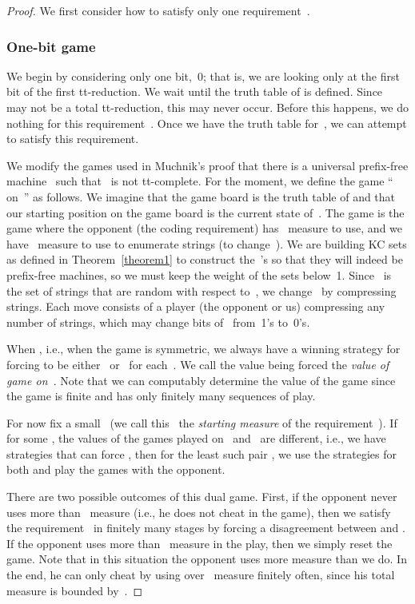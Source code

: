 \documentclass{LMCS}
\newcommand{\0}{\mathbf{0}}
\newcommand{\<}{\langle}
\renewcommand{\>}{\rangle}
\begin{document}
\begin{proof}
We first consider how to satisfy only one requirement~.



\subsubsection{One-bit game}\label{onebit}
We begin by considering only one bit,~0; that is, we are looking only at the
first bit of the first tt-reduction.  We wait until the truth table of
 is defined.  Since~ may not be a total tt-reduction, this
may never occur.   Before this happens, we do nothing for this
requirement~. Once we have the truth table for~, we
can attempt to satisfy this requirement.

We modify the games used in Muchnik's proof that there is a universal
prefix-free machine~ such that~ is not tt-complete.  For the
moment, we define the game `` on~'' as follows. We
imagine that the game board is the truth table of  and that our
starting position on the game board is the current state of~.  The game
 is the game where the opponent (the coding requirement)
has~ measure to use, and we have~ measure to use to
enumerate strings (to change~).  We are building KC sets as defined in
Theorem~\ref{theorem1} to construct the~'s so that they will indeed be
prefix-free machines, so we must keep the weight of the sets below~1.
Since~ is the set of strings that are random with respect to~, we
change~ by compressing strings.  Each move consists of a player (the
opponent or us) compressing any number of strings, which may change bits
of~ from~1's to~0's.

When , i.e., when the game is symmetric, we always have a
winning strategy for forcing  to be either~ or~ for
each~.  We call the value being forced the \emph{value of game
 on~}.  Note that we can computably determine the
value of the game since the game is finite and has only finitely many
sequences of play.

For now fix a small~ (we call this~ the
\emph{starting measure} of the requirement~). If for some , the values of the games  played on~
and~ are different, i.e., we have strategies that can force
, then for the least such pair , we
use the strategies for both and play the games with the opponent.

There are two possible outcomes of this dual game. First, if the opponent
never uses more than~ measure (i.e., he does not cheat in the
game), then we satisfy the requirement~ in finitely many
stages by forcing a disagreement between  and .
If the opponent uses more than~ measure in the play, then we
simply reset the game.  Note that in this situation the opponent uses more
measure than we do.  In the end, he can only cheat by using over~
measure finitely often, since his total measure is bounded by~.


\end{proof}
\end{document}
